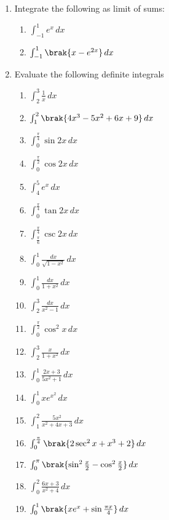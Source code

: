 \begin{enumerate}[label=\arabic*.,ref=\thesubsection.\theenumi]
%
\item Integrate the following as limit of sums:
\begin{enumerate}[label = (\roman*)]
\item $\int_{-1}^{1}e^x\, dx$
\item $\int_{-1}^{1}\brak{x-e^{2x}}\, dx$
\end{enumerate}
%
\item Evaluate the following definite integrals
%
\begin{enumerate}[label = (\roman*)]
\item $\int_{2}^{3}\frac{1}{x}\, dx$
\item $\int_{1}^{2}\brak{4x^3-5x^2+6x+9} \, dx$
\item $\int_{0}^{\frac{\pi}{4}}\sin 2x\, dx$
\item $\int_{0}^{\frac{\pi}{2}}\cos 2x\, dx$
\item $\int_{4}^{5}e^{x}\, dx$
\item $\int_{0}^{\frac{\pi}{4}}\tan 2x\, dx$
\item $\int_{\frac{\pi}{6}}^{\frac{\pi}{4}}\csc 2x\, dx$
\item $\int_{0}^{1}\frac{dx}{\sqrt{1-x^2}}\, dx$
\item $\int_{0}^{1}\frac{dx}{1+x^2}\, dx$
\item $\int_{2}^{3}\frac{dx}{x^2-1}\, dx$
\item $\int_{0}^{\frac{\pi}{2}}\cos^2 x\, dx$
\item $\int_{2}^{3}\frac{x}{1+x^2}\, dx$
\item $\int_{0}^{1}\frac{2x+3}{5x^2+1}\, dx$
\item $\int_{0}^{1}xe^{x^2}\, dx$
\item $\int_{1}^{2}\frac{5x^2}{x^2+4x+3}\, dx$
\item $\int_{0}^{\frac{\pi}{4}}\brak{2\sec^2 x + x^3+2}\, dx$
\item $\int_{0}^{\pi}\brak{\sin^2\frac{x}{2}-\cos^2\frac{x}{2}}\, dx$
\item $\int_{0}^{2}\frac{6x+3}{x^2+4}\, dx$
\item $\int_{0}^{1}\brak{xe^{x}+\sin\frac{\pi x}{4}}\, dx$
\end{enumerate}

\end{enumerate}
